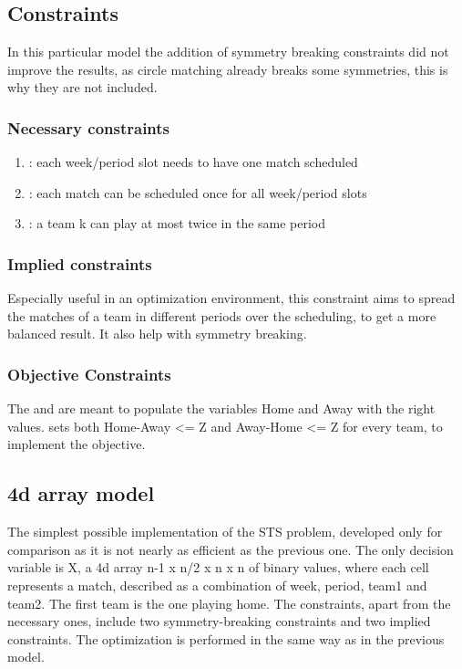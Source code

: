 \subsection{Constraints}
In this particular model the addition of symmetry breaking constraints did not improve the results, as circle matching already breaks some symmetries, this is why they are not included.

\subsubsection*{Necessary constraints}
\begin{enumerate}
\item {}: each week/period slot needs to have one match scheduled
\item {}: each match can be scheduled once for all week/period slots 
\item {}: a team k can play at most twice in the same period
\end{enumerate}


\subsubsection*{Implied constraints}
Especially useful in an optimization environment, this constraint aims to spread the matches of a team in different periods over the scheduling, to get a more balanced result. It also help with symmetry breaking.
\subsubsection*{Objective Constraints}
The  and  are meant to populate the variables Home and Away with the right values.
 sets both Home-Away <= Z and Away-Home <= Z for every team, to implement the objective.

\subsection{4d array model}
The simplest possible implementation of the STS problem, developed only for comparison as it is not nearly as efficient as the previous one.
The only decision variable is X, a 4d array n-1 x n/2 x n x n of binary values, where each cell represents a match, described as a combination of week, period, team1 and team2. The first team is the one playing home.
The constraints, apart from the necessary ones, include two symmetry-breaking constraints and two implied constraints.
The optimization is performed in the same way as in the previous model.

